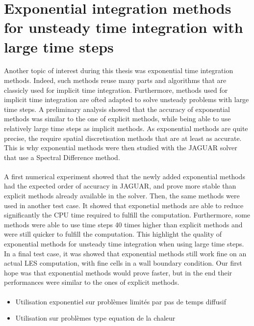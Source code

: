   \section*{Exponential integration methods for unsteady time integration with large time steps}

    \paragraph{}
    Another topic of interest during this thesis was exponential time integration methods.
    Indeed, such methods reuse many parts and algorithms that are classicly used for implicit time integration.
    Furthermore, methods used for implicit time integration are ofted adapted to solve unsteady problems with large time steps.
    A preliminary analysis showed that the accuracy of exponential methods was similar to the one of explicit methods, while being able to use relatively large time steps as implicit methods.
    As exponential methods are quite precise, the require spatial discretisation methods that are at least as accurate.
    This is why exponential methods were then studied with the JAGUAR solver that use a Spectral Difference method.

    \paragraph{}
    A first numerical experiment showed that the newly added exponential methods had the expected order of accuracy in JAGUAR, and prove more stable than explicit methods already available in the solver.
    Then, the same methods were used in another test case.
    It showed that exponetial methods are able to reduce significantly the CPU time required to fulfill the computation.
    Furthermore, some methods were able to use time steps 40 times higher than explicit methods and were still quicker to fulfill the computation.
    This highlight the quality of exponential methods for unsteady time integration when using large time steps.
    In a final test case, it was showed that exponential methods still work fine on an actual LES computation, with fine cells in a wall boundary condition.
    Our first hope was that exponential methods would prove faster, but in the end their performances were similar to the ones of explicit methods.

    \paragraph{}
    \begin{itemize}
      \item Utilisation exponentiel sur problèmes limités par pas de temps diffusif
      \item Utilisation sur problèmes type equation de la chaleur
    \end{itemize}
